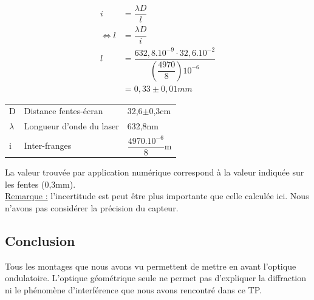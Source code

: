 \documentclass[12pt,a4paper]{article}
\begin{document}
	\begin{multicols}{2}
		\noindent
		\begin{align*}
		i&=\dfrac{\lambda D}{l}\\
		\iff l &= \dfrac{\lambda D}{i}\\
		l&=\dfrac{632,8.10^{-9}\cdot 32,6.10^{-2}}{\left(\dfrac{4970}{8}\right)10^{-6}}\\
		&=0,33\pm 0,01mm
		\end{align*}
		\columnbreak
		\vfill
		\begin{tabular}{lll}
			D & Distance fentes-écran & 32,6$\pm$0,3cm\\
			$\lambda$ & Longueur d'onde du laser & 632,8nm\\
			i & Inter-franges & $\dfrac{4970.10^{-6}}{8}$m
		\end{tabular}
	\end{multicols}
La valeur trouvée par application numérique correspond à la valeur indiquée sur les fentes (0,3mm).\\
\underline{Remarque :} l'incertitude est peut être plus importante que celle calculée ici. Nous n'avons pas considérer la précision du capteur.
\subsection{Conclusion}

Tous les montages que nous avons vu permettent de mettre en avant l'optique ondulatoire. L'optique géométrique seule ne permet pas d'expliquer la diffraction ni le phénomène d'interférence que nous avons rencontré dans ce TP.
\end{document}
